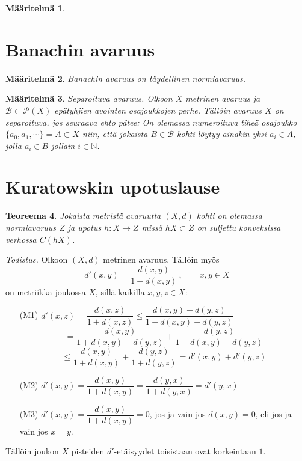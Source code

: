 \documentclass[12pt,a4paper,reqno]{amsart}
\newcommand{\N}{\mathbb{N}}
\newtheorem{maar}{Määritelmä}[section]
\newtheorem{teoreema}[maar]{Teoreema}
\begin{document}
\begin{maar}

\end{maar}

\newpage
\section{Banachin avaruus}

\begin{maar}Banachin avaruus on täydellinen normiavaruus.
\end{maar}

\begin{maar}Separoituva avaruus. \emph{Olkoon $X$ metrinen avaruus ja $\mathcal{B}\subset \mathcal{P}( X)$ epätyhjien avointen osajoukkojen perhe. Tällöin avaruus $X$ on separoituva, jos seuraava ehto pätee: On olemassa numeroituva tiheä osajoukko $\{a_0,a_1,\cdots\}=A\subset X$ niin, että jokaista $B\in\mathcal{B}$ kohti löytyy ainakin yksi $a_i\in A$, jolla $a_i\in B$ jollain $i\in \N$.}
\end{maar}


\newpage
\section{Kuratowskin upotuslause}
\noindent 
\begin{teoreema}
Jokaista metristä avaruutta $(X,d)$ kohti on olemassa normiavaruus $Z$ ja upotus $h\colon X\rightarrow Z$ missä $ hX\subset Z$ on suljettu konveksissa verhossa $C(hX)$. 
\end{teoreema} 
 
\vspace{0.5cm}

\noindent\emph{Todistus.} Olkoon $(X,d)$ metrinen avaruus. Tällöin myös
$$d'(x,y)=\dfrac{d(x,y)}{1+d(x,y)} \, , \qquad x,y\in X$$
on metriikka joukossa $X$, sillä kaikilla $x,y,z\in X$:
\begin{itemize}
\item[(M1)]$d'(x,z)=\dfrac{d(x,z)}{1+d(x,z)}\leq \dfrac{d(x,y)+d(y,z)}{1+d(x,y)+d(y,z)}$
$$= \dfrac{d(x,y)}{1+d(x,y)+d(y,z)}+ \dfrac{d(y,z)}{1+d(x,y)+d(y,z)}$$
$$\leq \dfrac{d(x,y)}{1+d(x,y)}+ \dfrac{d(y,z)}{1+d(y,z)}=d'(x,y)+d'(y,z)$$
\item[(M2)]$d'(x,y)=\dfrac{d(x,y)}{1+d(x,y)}=\dfrac{d(y,x)}{1+d(y,x)}=d'(y,x)$
\item[(M3)]$d'(x,y)=\dfrac{d(x,y)}{1+d(x,y)}=0$, jos ja vain jos $d(x,y)=0$, eli jos ja vain jos $x=y$.
\end{itemize} 
Tällöin joukon $X$ pisteiden $d'$-etäisyydet toisistaan ovat korkeintaan $1$.
\end{document}
